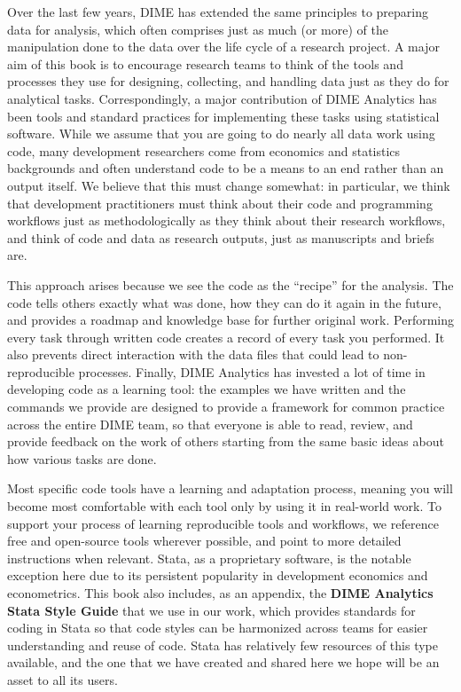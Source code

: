 Over the last few years, DIME has extended the same principles to preparing data for analysis,
which often comprises just as much (or more) of the manipulation done to the data
over the life cycle of a research project.
A major aim of this book is to encourage research teams
to think of the tools and processes they use
for designing, collecting, and handling data
just as they do for analytical tasks.
Correspondingly, a major contribution of DIME Analytics
has been tools and standard practices
for implementing these tasks using statistical software.
While we assume that you are going to do nearly all data work using code,
many development researchers come from economics and statistics backgrounds
and often understand code to be a means to an end rather than an output itself.
We believe that this must change somewhat:
in particular, we think that development practitioners
must think about their code and programming workflows
just as methodologically as they think about their research workflows,
and think of code and data as research outputs, just as manuscripts and briefs are.

This approach arises because we see the code as the ``recipe'' for the analysis.
The code tells others exactly what was done,
how they can do it again in the future,
and provides a roadmap and knowledge base for further original work.\cite{hamermesh2007replication}
Performing every task through written code
creates a record of every task you performed.\cite{ozier2019replication}
It also prevents direct interaction
with the data files that could lead to non-reproducible processes.\cite{chang2015economics}
Finally, DIME Analytics has invested a lot of time in developing code as a learning tool:
the examples we have written and the commands we provide
are designed to provide a framework for common practice
across the entire DIME team, so that everyone is able to
read, review, and provide feedback on the work of others
starting from the same basic ideas about how various tasks are done.

Most specific code tools have a learning and adaptation process,
meaning you will become most comfortable with each tool
only by using it in real-world work.
To support your process of learning reproducible tools and workflows,
we reference free and open-source tools wherever possible,
and point to more detailed instructions when relevant.
Stata, as a proprietary software, is the notable exception here
due to its persistent popularity in development economics and econometrics.
This book also includes, as an appendix,
the \textbf{DIME Analytics Stata Style Guide}
that we use in our work, which provides
standards for coding in Stata so that code styles
can be harmonized across teams for easier understanding and reuse of code.
Stata has relatively few resources of this type available,
and the one that we have created and shared here
we hope will be an asset to all its users.

